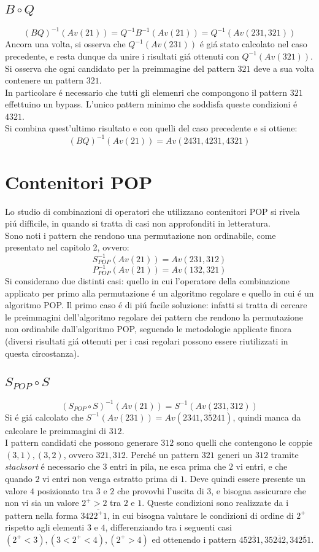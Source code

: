 \subsection*{$B\circ{Q}$}$$(BQ)^{-1}(Av(21))=Q^{-1}B^{-1}(Av(21))=Q^{-1}(Av(231,321))$$
Ancora una volta, si osserva che $Q^{-1}(Av(231))$ \'e gi\'a stato calcolato nel caso precedente, e resta dunque da unire i risultati gi\'a ottenuti con $Q^{-1}(Av(321))$.\\
Si osserva che ogni candidato per la preimmagine del pattern $321$ deve a sua volta contenere un pattern $321$.\\
In particolare \'e necessario che tutti gli elemenri che compongono il pattern $321$ effettuino un bypass. L'unico pattern minimo che soddisfa queste condizioni \'e $4321$.\\Si combina quest'ultimo risultato e con quelli del caso precedente e si ottiene:$$(BQ)^{-1}(Av(21))=Av(2431,4231,4321)$$
\section*{Contenitori POP}
Lo studio di combinazioni di operatori che utilizzano contenitori POP si rivela pi\'u difficile, in quando si tratta di casi non approfonditi in letteratura.\\
Sono noti i pattern che rendono una permutazione non ordinabile, come presentato nel capitolo 2, ovvero:$$S_{POP}^{-1}(Av(21)) = Av(231,312)$$$$P_{POP}^{-1}(Av(21))=Av(132,321)$$
Si considerano due distinti casi: quello in cui l'operatore della combinazione applicato per primo alla permutazione \'e un algoritmo regolare e quello in cui \'e un algoritmo POP. Il primo caso \'e di pi\'u facile soluzione: infatti si tratta di cercare le preimmagini dell'algoritmo regolare dei pattern che rendono la permutazione non ordinabile dall'algoritmo POP, seguendo le metodologie applicate finora (diversi risultati gi\'a ottenuti per i casi regolari possono essere riutilizzati in questa circostanza).
\subsection*{$S_{POP}\circ{S}$}$$(S_{POP}\circ{S})^{-1}(Av(21))=S^{-1}(Av(231,312))$$
Si \'e gi\'a calcolato che $S^{-1}(Av(231))=Av(2341, 3\overline{5}241)$, quindi manca da calcolare le preimmagini di $312$.\\
I pattern candidati che possono generare $312$ sono quelli che contengono le coppie $(3,1),(3,2)$, ovvero $321, 312$.
Perch\'e un pattern $321$ generi un $312$ tramite \textit{stacksort} \'e necessario che $3$ entri in pila, ne esca prima che $2$ vi entri, e che quando $2$ vi entri non venga estratto prima di $1$. Deve quindi essere presente un valore $4$ posizionato tra $3$ e $2$ che provovhi l'uscita di $3$, e bisogna assicurare che non vi sia un valore $2^+>2$ tra $2$ e $1$. Queste condizioni sono realizzate da i pattern nella forma $342\overline{2^+}1$, in cui bisogna valutare le condizioni di ordine di $2^+$ rispetto agli elementi $3$ e $4$, differenziando tra i seguenti casi $(2^+<3), (3<2^+<4), (2^+>4)$ ed ottenendo i pattern $452\overline{3}1, 352\overline{4}2, 342\overline{5}1$.\\